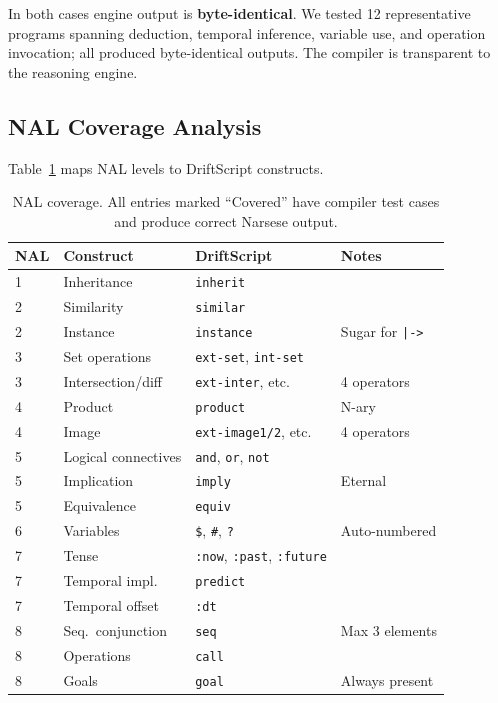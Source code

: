 \documentclass[11pt,a4paper]{article}
\begin{document}
In both cases engine output is \textbf{byte-identical}. We tested 12
representative programs spanning deduction, temporal inference, variable use,
and operation invocation; all produced byte-identical outputs. The compiler is
transparent to the reasoning engine.

\subsection{NAL Coverage Analysis}

Table~\ref{tab:coverage} maps NAL levels to DriftScript constructs.

\begin{table}[h]
\centering
\caption{NAL coverage. All entries marked ``Covered'' have compiler test
cases and produce correct Narsese output.}
\label{tab:coverage}
\begin{tabular}{llll}
\toprule
\textbf{NAL} & \textbf{Construct} & \textbf{DriftScript} & \textbf{Notes} \\
\midrule
1 & Inheritance & \texttt{inherit} & \\
2 & Similarity & \texttt{similar} & \\
2 & Instance & \texttt{instance} & Sugar for \texttt{|->} \\
3 & Set operations & \texttt{ext-set}, \texttt{int-set} & \\
3 & Intersection/diff & \texttt{ext-inter}, etc. & 4 operators \\
4 & Product & \texttt{product} & N-ary \\
4 & Image & \texttt{ext-image1/2}, etc. & 4 operators \\
5 & Logical connectives & \texttt{and}, \texttt{or}, \texttt{not} & \\
5 & Implication & \texttt{imply} & Eternal \\
5 & Equivalence & \texttt{equiv} & \\
6 & Variables & \texttt{\$}, \texttt{\#}, \texttt{?} & Auto-numbered \\
7 & Tense & \texttt{:now}, \texttt{:past}, \texttt{:future} & \\
7 & Temporal impl. & \texttt{predict} & \\
7 & Temporal offset & \texttt{:dt} & \\
8 & Seq.\ conjunction & \texttt{seq} & Max 3 elements \\
8 & Operations & \texttt{call} & \\
8 & Goals & \texttt{goal} & Always present \\
\bottomrule
\end{tabular}
\end{table}
\end{document}
